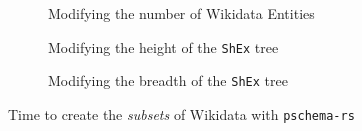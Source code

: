 \begin{figure}[p]
    \begin{subfigure}{\textwidth}
        \centering
        
        \caption{Modifying the number of Wikidata Entities}
    \end{subfigure}%
    \vspace*{1em}
    \begin{subfigure}{\textwidth}
        \centering
        
        \caption{Modifying the height of the \texttt{ShEx} tree}
    \end{subfigure}%
    \vspace*{1em}
    \begin{subfigure}{\textwidth}
        \centering
        
        \caption{Modifying the breadth of the \texttt{ShEx} tree}
    \end{subfigure}
    \caption{Time to create the \textit{subsets} of Wikidata with \texttt{pschema-rs}}
    \label{figure:pschema-rs:parameters}
\end{figure}